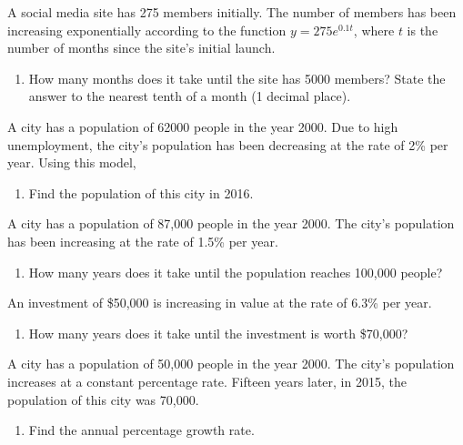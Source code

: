 \begin{puzzle}
    A social media site has 275 members initially. The number of members has been increasing exponentially according to the function \( y = 275e^{0.1t} \), where \( t \) is the number of months since the site's initial launch.
    \begin{enumerate}
        \item How many months does it take until the site has 5000 members? State the answer to the nearest tenth of a month (1 decimal place).
    \end{enumerate}
\end{puzzle}

\begin{puzzle}
    A city has a population of 62000 people in the year 2000. Due to high unemployment, the city's population has been decreasing at the rate of 2\% per year. Using this model,
    \begin{enumerate}
        \item Find the population of this city in 2016.
    \end{enumerate}
\end{puzzle}

\begin{puzzle}
    A city has a population of 87,000 people in the year 2000. The city's population has been increasing at the rate of 1.5\% per year.
    \begin{enumerate}
        \item How many years does it take until the population reaches 100,000 people?
    \end{enumerate}
\end{puzzle}

\begin{puzzle}
    An investment of \$50,000 is increasing in value at the rate of 6.3\% per year.
    \begin{enumerate}
        \item How many years does it take until the investment is worth \$70,000?
    \end{enumerate}
\end{puzzle}

\begin{puzzle}
    A city has a population of 50,000 people in the year 2000. The city’s population increases at a constant percentage rate. Fifteen years later, in 2015, the population of this city was 70,000.
    \begin{enumerate}
        \item Find the annual percentage growth rate.
    \end{enumerate}
\end{puzzle}

